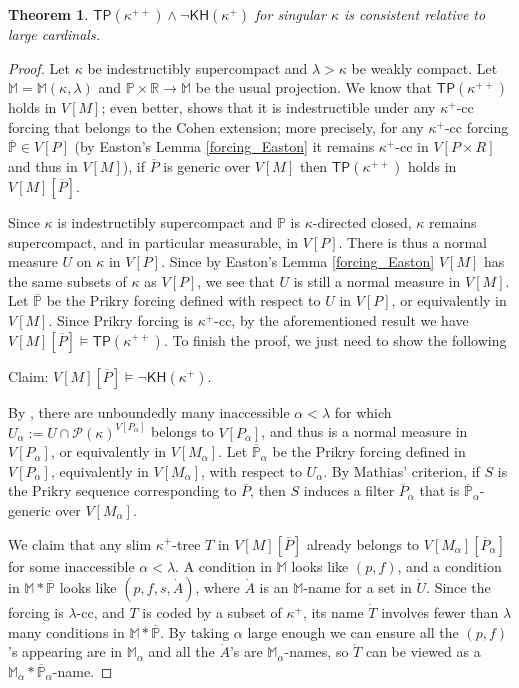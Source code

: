 \documentclass[10pt,reqno]{amsart}
\theoremstyle{plain}
\newtheorem{theorem}{Theorem}[section]
\theoremstyle{definition}
\theoremstyle{remark}
\begin{document}
\begin{theorem}
$\mathsf{TP(\kappa^{++})\land\lnot\mathsf{KH}(\kappa^+)}$ for singular $\kappa$ is consistent relative to large cardinals.
\end{theorem}
\begin{proof}
Let $\kappa$ be indestructibly supercompact and $\lambda>\kappa$ be weakly compact. Let $\mathbb{M}=\mathbb{M}(\kappa,\lambda)$ and $\mathbb{P}\times\mathbb{R}\rightarrow\mathbb{M}$ be the usual projection. We know that $\mathsf{TP}(\kappa^{++})$ holds in $V[M]$; even better, \cite[Theorem 3.2]{honzik2020indestructibility} shows that it is indestructible under any $\kappa^+$-cc forcing that belongs to the Cohen extension; more precisely, for any $\kappa^+$-cc forcing $\overline{\mathbb{P}}\in V[P]$ (by Easton's Lemma \ref{forcing_Easton} it remains $\kappa^+$-cc in $V[P\times R]$ and thus in $V[M]$), if $\overline{P}$ is generic over $V[M]$ then $\mathsf{TP}(\kappa^{++})$ holds in $V[M][\overline{P}]$.

Since $\kappa$ is indestructibly supercompact and $\mathbb{P}$ is $\kappa$-directed closed, $\kappa$ remains supercompact, and in particular measurable, in $V[P]$. There is thus a normal measure $U$ on $\kappa$ in $V[P]$. Since by Easton's Lemma \ref{forcing_Easton} $V[M]$ has the same subsets of $\kappa$ as $V[P]$, we see that $U$ is still a normal measure in $V[M]$. Let $\overline{\mathbb{P}}$ be the Prikry forcing defined with respect to $U$ in $V[P]$, or equivalently in $V[M]$. Since Prikry forcing is $\kappa^+$-cc, by the aforementioned result we have $V[M][\overline{P}]\models\mathsf{TP}(\kappa^{++})$. To finish the proof, we just need to show the following

Claim: $V[M][\overline{P}]\models\mathsf{\lnot KH}(\kappa^+)$.

By \cite[Lemma 5.1]{cummings1998tree}, there are unboundedly many inaccessible $\alpha<\lambda$ for which $U_\alpha:=U\cap\mathcal{P}(\kappa)^{V[P_\alpha]}$ belongs to $V[P_\alpha]$, and thus is a normal measure in $V[P_\alpha]$, or equivalently in $V[M_\alpha]$. Let $\overline{\mathbb{P}}_\alpha$ be the Prikry forcing defined in $V[P_\alpha]$, equivalently in $V[M_\alpha]$, with respect to $U_\alpha$. By Mathias' criterion, if $S$ is the Prikry sequence corresponding to $\overline{P}$, then $S$ induces a filter $\overline{P}_\alpha$ that is $\overline{\mathbb{P}}_\alpha$-generic over $V[M_\alpha]$.

We claim that any slim $\kappa^+$-tree $T$ in $V[M][\overline{P}]$ already belongs to $V[M_\alpha][\overline{P}_\alpha]$ for some inaccessible $\alpha<\lambda$. A condition in $\mathbb{M}$ looks like $(p,f)$, and a condition in $\mathbb{M}*\overline{\mathbb{P}}$ looks like $(p,f,s,\dot{A})$, where $\dot{A}$ is an $\mathbb{M}$-name for a set in $\dot{U}$. Since the forcing is $\lambda$-cc, and $T$ is coded by a subset of $\kappa^+$, its name $\dot{T}$ involves fewer than $\lambda$ many conditions in $\mathbb{M}*\overline{\mathbb{P}}$. By taking $\alpha$ large enough we can ensure all the $(p,f)$'s appearing are in $\mathbb{M}_\alpha$ and all the $\dot{A}$'s are $\mathbb{M}_\alpha$-names, so $\dot{T}$ can be viewed as a $\mathbb{M}_\alpha*\overline{\mathbb{P}}_\alpha$-name.


\end{proof}
\end{document}
